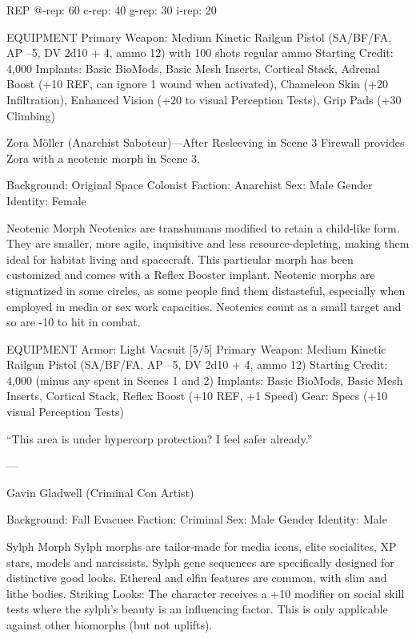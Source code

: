 ﻿%

   REP
   @-rep:	60
   c-rep:	40
   g-rep:	30
   i-rep:	20

   EQUIPMENT
   Primary Weapon: Medium Kinetic Railgun Pistol (SA/BF/FA, AP –5, DV 2d10 + 4,
   ammo 12) with 100 shots regular ammo
   Starting Credit: 4,000
   Implants: Basic BioMods, Basic Mesh Inserts, Cortical Stack, Adrenal Boost (+10
   REF, can ignore 1 wound when activated), Chameleon Skin (+20 Infiltration),
   Enhanced Vision (+20 to visual Perception Tests), Grip Pads (+30 Climbing)

Zora Möller (Anarchist Saboteur)—After Resleeving in Scene 3
Firewall provides Zora with a neotenic morph in Scene 3.

Background: Original Space Colonist
Faction: Anarchist
Sex: Male
Gender Identity: Female

Neotenic Morph
Neotenics are transhumans modified to retain a child-like form. They are smaller, more agile, inquisitive and less resource-depleting, making them ideal for habitat living and spacecraft. This particular morph has been customized and comes with a Reflex Booster implant. Neotenic morphs are stigmatized in some circles, as some people find them distasteful, especially when employed in media or sex work capacities. Neotenics count as a small target and so are -10 to hit in combat.

EQUIPMENT
Armor: Light Vacsuit [5/5]
Primary Weapon: Medium Kinetic Railgun Pistol (SA/BF/FA, AP –5, DV 2d10 + 4, ammo 12)
Starting Credit: 4,000 (minus any spent in Scenes 1 and 2)
Implants: Basic BioMods, Basic Mesh Inserts, Cortical Stack, Reflex Boost (+10 REF, +1 Speed)
Gear: Specs (+10 visual Perception Tests)

“This area is under hypercorp protection? I feel safer already.”

---

Gavin Gladwell (Criminal Con Artist)

Background: Fall Evacuee
Faction: Criminal
Sex: Male
Gender Identity: Male

Sylph Morph
Sylph morphs are tailor-made for media icons, elite socialites, XP stars, models and narcissists. Sylph gene sequences are specifically designed for distinctive good looks. Ethereal and elfin features are common, with slim and lithe bodies.
Striking Looks: The character receives a +10 modifier on social skill tests where the sylph's beauty is an influencing factor. This is only applicable against other biomorphs (but not uplifts).

